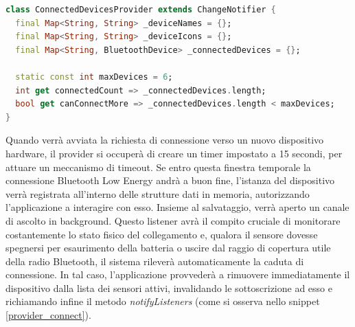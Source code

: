 \documentclass[target=bach,aauheader=,style=]{thud}
\begin{document}
\begin{lstlisting}[language=dart, caption={Strutture dati del Provider e limite massimo di connessioni.}, label={provider_vars}]
class ConnectedDevicesProvider extends ChangeNotifier {
  final Map<String, String> _deviceNames = {};
  final Map<String, String> _deviceIcons = {};
  final Map<String, BluetoothDevice> _connectedDevices = {};
  
  static const int maxDevices = 6;
  int get connectedCount => _connectedDevices.length;
  bool get canConnectMore => _connectedDevices.length < maxDevices;
}
\end{lstlisting}
Quando verrà avviata la richiesta di connessione verso un nuovo dispositivo hardware, il provider si occuperà di creare un timer impostato a 15 secondi, per attuare un meccanismo di timeout. Se entro questa finestra temporale la connessione Bluetooth Low Energy andrà a buon fine, l'istanza del dispositivo verrà registrata all'interno delle strutture dati in memoria, autorizzando l'applicazione a interagire con esso. Insieme al salvataggio, verrà aperto un canale di ascolto in background. Questo listener avrà il compito cruciale di monitorare costantemente lo stato fisico del collegamento e, qualora il sensore dovesse spegnersi per esaurimento della batteria o uscire dal raggio di copertura utile della radio Bluetooth, il sistema rileverà automaticamente la caduta di connessione. In tal caso, l'applicazione provvederà a rimuovere immediatamente il dispositivo dalla lista dei sensori attivi, invalidando le sottoscrizione ad esso e richiamando infine il metodo \textit{notifyListeners} (come si osserva nello snippet \ref{provider_connect}).
\end{document}
